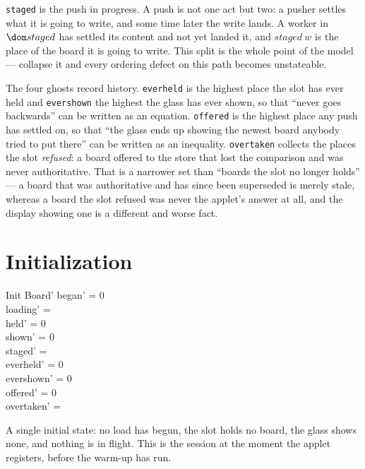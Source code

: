\documentclass[a4paper,10pt,fleqn]{article}
\begin{document}
\texttt{staged} is the push in progress. A push is not one act but two: a
pusher settles what it is going to write, and some time later the write lands.
A worker in $\dom staged$ has settled its content and not yet landed it, and
$staged~w$ is the place of the board it is going to write. This split is the
whole point of the model --- collapse it and every ordering defect on this path
becomes unstateable.

The four ghosts record history. \texttt{everheld} is the highest place the slot
has ever held and \texttt{evershown} the highest the glass has ever shown, so
that ``never goes backwards'' can be written as an equation. \texttt{offered} is
the highest place any push has settled on, so that ``the glass ends up showing
the newest board anybody tried to put there'' can be written as an inequality.
\texttt{overtaken} collects the places the slot \emph{refused}: a board offered
to the store that lost the comparison and was never authoritative. That is a
narrower set than ``boards the slot no longer holds'' --- a board that was
authoritative and has since been superseded is merely stale, whereas a board the
slot refused was never the applet's answer at all, and the display showing one
is a different and worse fact.

\section{Initialization}

\begin{schema}{Init}
  Board'
\where
  began' = 0 \\
  loading' = \emptyset \\
  held' = 0 \\
  shown' = 0 \\
  staged' = \emptyset \\
  everheld' = 0 \\
  evershown' = 0 \\
  offered' = 0 \\
  overtaken' = \emptyset
\end{schema}

A single initial state: no load has begun, the slot holds no board, the glass
shows none, and nothing is in flight. This is the session at the moment the
applet registers, before the warm-up has run.

\end{document}
